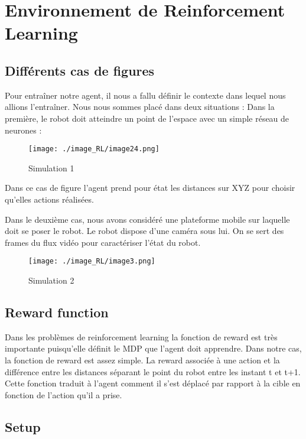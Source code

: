 \section{Environnement de Reinforcement Learning}

\subsection{Différents cas de figures}
Pour entraîner notre agent, il nous a fallu définir le contexte dans lequel nous allions l’entraîner.
Nous nous sommes placé dans deux situations :
Dans la première, le robot doit atteindre un point de l’espace avec un simple réseau de neurones : 

\begin{figure}[H]
    \centering
    \texttt{[image: ./image\_RL/image24.png]}
    \caption{Simulation 1}
\end{figure}

Dans ce cas de figure l’agent prend pour état les distances sur XYZ pour choisir qu’elles actions réalisées. 

Dans le deuxième cas, nous avons considéré une plateforme mobile sur laquelle doit se poser le robot. Le robot dispose d’une caméra sous lui. On se sert des frames du flux vidéo pour caractériser l’état du robot.

\begin{figure}[H]
    \centering
    \texttt{[image: ./image\_RL/image3.png]}
    \caption{Simulation 2}
\end{figure}

\subsection{Reward function}
Dans les problèmes de reinforcement learning la fonction de reward est très importante puisqu’elle définit le MDP que l’agent doit apprendre.
Dans notre cas, la fonction de reward est assez simple.
La reward associée à une action et la différence entre les distances séparant le point du robot entre les instant t et t+1. 
Cette fonction traduit à l’agent comment il s’est déplacé par rapport à la cible en fonction de l’action qu’il a prise.

\subsection{Setup}

